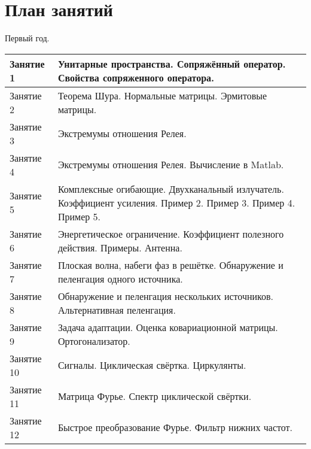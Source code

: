 \chapter{План занятий}

Первый год.

{
\center
\begin{tabular}{|p{3cm}|p{12cm}|}
    \hline
    Занятие 1  & Унитарные пространства. Сопряжённый оператор. Свойства сопряженного оператора.                                 \\
    \hline
    Занятие 2  & Теорема Шура. Нормальные матрицы. Эрмитовые матрицы.                                                           \\
    \hline
    Занятие 3  & Экстремумы отношения Релея.                                                                                    \\
    \hline
    Занятие 4  & Экстремумы отношения Релея. Вычисление в Matlab.                                                               \\
    \hline
    Занятие 5  & Комплексные огибающие. Двухканальный излучатель. Коэффициент усиления. Пример 2. Пример 3. Пример 4. Пример 5. \\
    \hline
    Занятие 6  & Энергетическое ограничение. Коэффициент полезного действия. Примеры. Антенна.                                  \\
    \hline
    Занятие 7  & Плоская волна, набеги фаз в решётке. Обнаружение и пеленгация одного источника.                                \\
    \hline
    Занятие 8  & Обнаружение и пеленгация нескольких источников. Альтернативная пеленгация.                                     \\
    \hline
    Занятие 9  & Задача адаптации. Оценка ковариационной матрицы. Ортогонализатор.                                              \\
    \hline
    Занятие 10 & Сигналы. Циклическая свёртка. Циркулянты.                                                                      \\
    \hline
    Занятие 11 & Матрица Фурье. Спектр циклической свёртки.                                                                     \\
    \hline
    Занятие 12 & Быстрое преобразование Фурье. Фильтр нижних частот.                                                            \\
    \hline
\end{tabular}
\par
}

